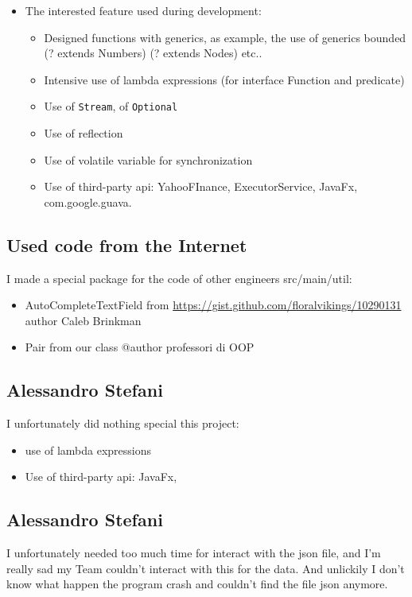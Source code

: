 \documentclass[a4paper,12pt]{report}
\begin{document}
\begin{itemize}
    \item The interested feature used during development:
    \begin{itemize}
        \item Designed functions with generics, as example, the use of generics bounded (? extends Numbers) (? extends Nodes) etc..
        \item Intensive use of lambda expressions (for interface Function and predicate)
        \item Use of \texttt{Stream}, of \texttt{Optional} 
        \item Use of reflection
        \item Use of volatile variable for synchronization
        \item Use of third-party api: YahooFInance, ExecutorService, JavaFx, com.google.guava.
    \end{itemize}
\end{itemize}

\subsection*{Used code from the Internet}

I made a special package for the code of other engineers src/main/util:
\begin{itemize}
    \item AutoCompleteTextField from \url{https://gist.github.com/floralvikings/10290131} author Caleb Brinkman
    \item Pair from our class @author professori di OOP 
\end{itemize}

\subsection{Alessandro Stefani}
I unfortunately did nothing special this project:
\begin{itemize}
    \item use of lambda expressions
    \item Use of third-party api: JavaFx,
\end{itemize}

\subsection{Alessandro Stefani}
I unfortunately needed too much time for interact with the json file, and I'm really sad my Team couldn't interact with this for the data.
And unlickily I don't know what happen the program crash and couldn't find the file json anymore.
\end{document}
